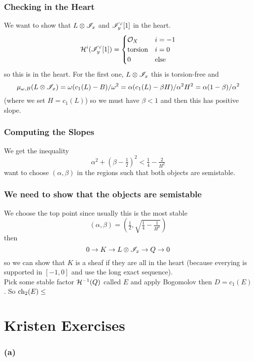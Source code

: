\documentclass[12pt]{article}
\begin{document}
\subsubsection{Checking in the Heart}

We want to show that $L \otimes \mathscr{I}_x$ and $\mathscr{I}_y^\vee[1]$ in the heart. 
\[ \mathcal{H}^i(\mathscr{I}_y^\vee[1]) = 
\begin{cases}
\mathcal{O}_{X} & i = -1
\\
\text{torsion} & i = 0
\\
0 & \text{else}
\end{cases} \]
so this is in the heart. For the first one, $L \otimes \mathscr{I}_x$ this is torsion-free and 
\[ \mu_{\omega, B}(L \otimes \mathscr{I}_x) = \omega (c_1(L)  - B) / \omega^2 = \alpha (c_1(L) - \beta H)/\alpha^2 H^2 = \alpha(1 - \beta)/\alpha^2 \]
(where we set $H = c_1(L)$) so we must have $\beta < 1$ and then this has positive slope. 

\subsubsection{Computing the Slopes}

We get the inequality
\[ \alpha^2 + (\beta - \tfrac{1}{2})^2 < \tfrac{1}{4} - \tfrac{2}{H^2} \]
want to choose $(\alpha, \beta)$ in the regions such that both objects are semistable. 

\subsubsection{We need to show that the objects are semistable}

We choose the top point since usually this is the most stable 
\[ (\alpha, \beta) = (\tfrac{1}{2}, \sqrt{\tfrac{1}{4} - \tfrac{1}{H^2}}) \]
then 
\[ 0 \to K \to L \otimes \mathscr{I}_x \to Q \to 0 \]
so we can show that $K$ is a sheaf if they are all in the heart (because everying is supported in $[-1,0]$ and use the long exact sequence). 
\bigskip\\
Pick some stable factor $\mathcal{H}^{-1}(Q)$ called $E$ and apply Bogomolov then $D = c_1(E)$. So $\mathrm{ch}_2(E) \le $



\section{Kristen Exercises}

\subsubsection{(a)}
\end{document}
